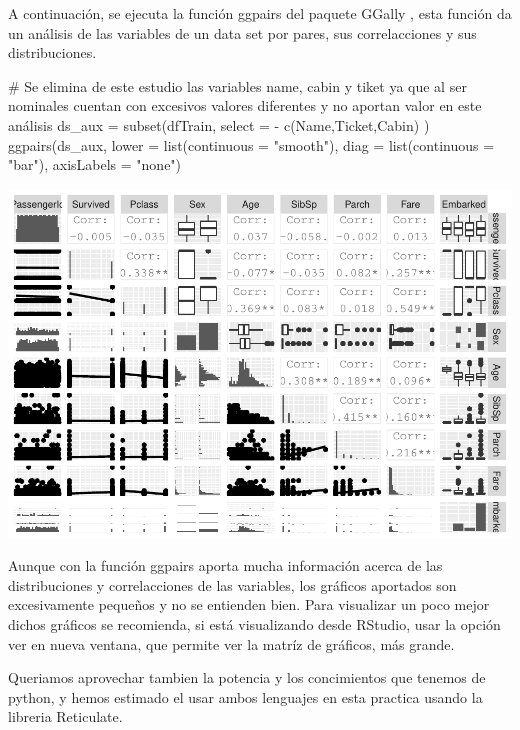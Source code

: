 \documentclass[
]{article}
\newenvironment{Shaded}{\begin{snugshade}}{\end{snugshade}}
\newcommand{\CommentTok}[1]{\textcolor[rgb]{0.50,0.62,0.50}{#1}}
\newcommand{\DataTypeTok}[1]{\textcolor[rgb]{0.87,0.87,0.75}{#1}}
\newcommand{\KeywordTok}[1]{\textcolor[rgb]{0.94,0.87,0.69}{#1}}
\newcommand{\NormalTok}[1]{\textcolor[rgb]{0.80,0.80,0.80}{#1}}
\newcommand{\OperatorTok}[1]{\textcolor[rgb]{0.94,0.94,0.82}{#1}}
\newcommand{\StringTok}[1]{\textcolor[rgb]{0.80,0.58,0.58}{#1}}
\begin{document}
A continuación, se ejecuta la función ggpairs del paquete GGally , esta
función da un análisis de las variables de un data set por pares, sus
correlacciones y sus distribuciones.

\begin{Shaded}
\begin{Highlighting}[]
\CommentTok{# Se elimina de este estudio las variables name, cabin y tiket ya que al ser nominales cuentan con excesivos valores diferentes y no aportan valor en este análisis}
\NormalTok{ds_aux =}\StringTok{ }\KeywordTok{subset}\NormalTok{(dfTrain, }\DataTypeTok{select =} \OperatorTok{-}\StringTok{ }\KeywordTok{c}\NormalTok{(Name,Ticket,Cabin) )}
\KeywordTok{ggpairs}\NormalTok{(ds_aux, }\DataTypeTok{lower =} \KeywordTok{list}\NormalTok{(}\DataTypeTok{continuous =} \StringTok{"smooth"}\NormalTok{), }
        \DataTypeTok{diag =} \KeywordTok{list}\NormalTok{(}\DataTypeTok{continuous =} \StringTok{"bar"}\NormalTok{), }\DataTypeTok{axisLabels =} \StringTok{"none"}\NormalTok{)}
\end{Highlighting}
\end{Shaded}

\includegraphics{m2851_PRA2_aruizplaza_rcotillas_files/figure-latex/unnamed-chunk-2-1.pdf}

Aunque con la función ggpairs aporta mucha información acerca de las
distribuciones y correlacciones de las variables, los gráficos aportados
son excesivamente pequeños y no se entienden bien. Para visualizar un
poco mejor dichos gráficos se recomienda, si está visualizando desde
RStudio, usar la opción ver en nueva ventana, que permite ver la matríz
de gráficos, más grande.

Queriamos aprovechar tambien la potencia y los concimientos que tenemos
de python, y hemos estimado el usar ambos lenguajes en esta practica
usando la libreria Reticulate.
\end{document}
